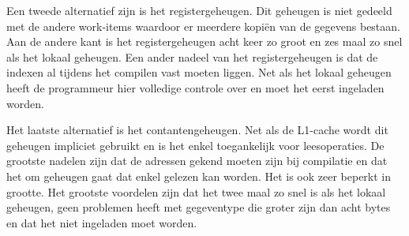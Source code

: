 Een tweede alternatief zijn is het registergeheugen. Dit geheugen is niet gedeeld met de andere work-items waardoor er meerdere kopi\"en van de gegevens bestaan. Aan de andere kant is het registergeheugen acht keer zo groot en zes maal zo snel als het lokaal geheugen. Een ander nadeel van het registergeheugen is dat de indexen al tijdens het compilen vast moeten liggen. Net als het lokaal geheugen heeft de programmeur hier volledige controle over en moet het eerst ingeladen worden.

Het laatste alternatief is het contantengeheugen. Net als de L1-cache wordt dit geheugen impliciet gebruikt en is het enkel toegankelijk voor leesoperaties. De grootste nadelen zijn dat de adressen gekend moeten zijn bij compilatie en dat het om geheugen gaat dat enkel gelezen kan worden. Het is ook zeer beperkt in grootte. Het grootste voordelen zijn dat het twee maal zo snel is als het lokaal geheugen, geen problemen heeft met gegeventype die groter zijn dan acht bytes en dat het niet ingeladen moet worden.